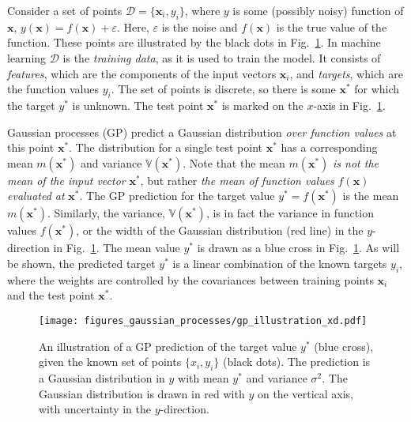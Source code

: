 \documentclass[twoside,english]{uiofysmaster}
\begin{document}
{Consider a set of points $\mathcal{D} = \{\textbf{x}_i, y_i\}$, where $y$ is some (possibly noisy) function of $\textbf{x}$, $y(\textbf{x}) = f(\textbf{x}) + \varepsilon$. Here, $\varepsilon$ is the noise and $f(\textbf{x})$ is the true value of the function. These points are illustrated by the black dots in Fig.~\ref{Fig:: gaussian process : GP illustration}. In machine learning $\mathcal{D}$ is the \textit{training data}, as it is used to train the model. It consists of \textit{features}, which are the components of the input vectors $\textbf{x}_i$, and \textit{targets}, which are the function values $y_i$. The set of points is discrete, so there is some $\textbf{x}^*$ for which the target $y^*$ is unknown. The test point $\textbf{x}^*$ is marked on the $x$-axis in Fig.~\ref{Fig:: gaussian process : GP illustration}.

Gaussian processes (GP) predict a Gaussian distribution \textit{over function values} at this point $\textbf{x}^*$. The distribution for a single test point $\textbf{x}^*$ has a corresponding mean $m(\textbf{x}^*)$ and variance $\mathbb{V}(\textbf{x}^*)$. Note that the mean $m(\textbf{x}^*)$ \textit{is not the mean of the input vector} $\textbf{x}^*$, but rather \textit{the mean of function values} $f(\textbf{x})$ \textit{evaluated at} $\textbf{x}^*$. The GP prediction for the target value $y^*=f(\textbf{x}^*)$ is the mean $m(\textbf{x}^*)$. Similarly, the variance, $\mathbb{V}(\textbf{x}^*)$, is in fact the variance in function values $f(\textbf{x}^*)$, or the width of the Gaussian distribution (red line) in the $y$-direction in Fig.~\ref{Fig:: gaussian process : GP illustration}. The mean value $y^*$ is drawn as a blue cross in Fig.~\ref{Fig:: gaussian process : GP illustration}. As will be shown, the predicted target $y^*$ is a linear combination of the known targets $y_i$, where the weights are controlled by the covariances between training points $\textbf{x}_i$ and the test point $\textbf{x}^*$.  


\begin{figure}
\centering
\texttt{[image: figures\_gaussian\_processes/gp\_illustration\_xd.pdf]}
\caption{An illustration of a GP prediction of the target value $y^*$ (blue cross), given the known set of points $\{x_i, y_i\}$ (black dots). The prediction is a Gaussian distribution in $y$ with mean $y^*$ and variance $\sigma^2$. The Gaussian distribution is drawn in red with $y$ on the vertical axis, with uncertainty in the $y$-direction.}
\label{Fig:: gaussian process : GP illustration}
\end{figure}

}
\end{document}

